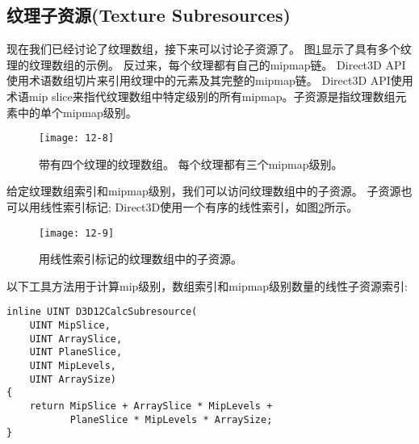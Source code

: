 \subsection{纹理子资源(Texture Subresources)}
\begin{flushleft}
现在我们已经讨论了纹理数组，接下来可以讨论子资源了。 图\ref{fig:12-8}显示了具有多个纹理的纹理数组的示例。 反过来，每个纹理都有自己的mipmap链。 Direct3D API使用术语数组切片来引用纹理中的元素及其完整的mipmap链。 Direct3D API使用术语mip slice来指代纹理数组中特定级别的所有mipmap。子资源是指纹理数组元素中的单个mipmap级别。\\
\end{flushleft}

\begin{figure}[h]
    \texttt{[image: 12-8]}
    \centering
    \caption{带有四个纹理的纹理数组。 每个纹理都有三个mipmap级别。}
    \label{fig:12-8}
\end{figure}

\begin{flushleft}
给定纹理数组索引和mipmap级别，我们可以访问纹理数组中的子资源。 子资源也可以用线性索引标记; Direct3D使用一个有序的线性索引，如图\ref{fig:12-9}所示。\\
\end{flushleft}

\begin{figure}[h]
    \texttt{[image: 12-9]}
    \centering
    \caption{用线性索引标记的纹理数组中的子资源。}
    \label{fig:12-9}
\end{figure}

\begin{flushleft}
以下工具方法用于计算mip级别，数组索引和mipmap级别数量的线性子资源索引:\\
\end{flushleft}

\begin{lstlisting}
inline UINT D3D12CalcSubresource(
    UINT MipSlice, 
    UINT ArraySlice,
    UINT PlaneSlice, 
    UINT MipLevels, 
    UINT ArraySize)
{
    return MipSlice + ArraySlice * MipLevels + 
           PlaneSlice * MipLevels * ArraySize;
}
\end{lstlisting}

